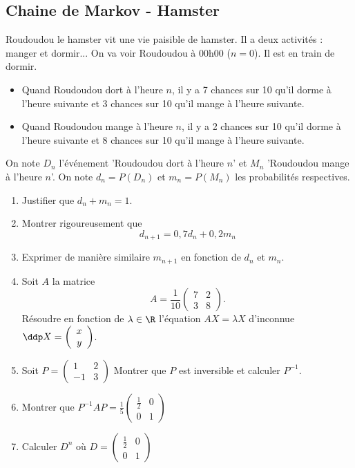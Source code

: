 \subsection{Chaine de Markov - Hamster}



\begin{exercice}
Roudoudou le hamster vit une vie paisible de hamster. Il a deux activités : manger et  dormir... 
On va voir Roudoudou à 00h00 ($n=0$). Il est en train de dormir. 
\begin{itemize}
\item Quand Roudoudou dort à l'heure $n$, il y a 7 chances sur 10 qu'il dorme à l'heure suivante et 3 chances sur 10 qu'il mange à l'heure suivante. 
\item Quand Roudoudou mange à l'heure $n$, il y a 2 chances sur 10 qu'il dorme à l'heure suivante et 8 chances sur 10 qu'il mange à l'heure suivante. 
\end{itemize}


On note $D_n$ l'événement 'Roudoudou dort à l'heure $n$' et $M_n$ 'Roudoudou mange à l'heure $n$'. On note $d_n =P(D_n)$ et $m_n=P(M_n)$ les probabilités respectives. 


\begin{enumerate}
\item Justifier que $d_n+m_n=1$. 
\item Montrer rigoureusement que $$d_{n+1} =  0,7d_n+0,2m_n$$
\item Exprimer de manière similaire $m_{n+1} $ en fonction de $d_n$ et $m_n$. 

\item Soit $A$ la matrice $$A=\frac{1}{10}\left(\begin{array}{ccc}
7 & 2\\
3 & 8
\end{array}
\right).$$
Résoudre en fonction de $\lambda \in \R$ l'équation $AX = \lambda X$ d'inconnue $\ddp X =\left(\begin{array}{c}
x \\
y 
\end{array}
\right)$. 
\item Soit $P = 
\left(\begin{array}{cc}
1 & 2\\	
-1 & 3
\end{array}
\right)$ Montrer que $P$ est inversible et calculer $P^{-1}$. 
\item Montrer que $P^{-1} A P =\frac{1}{5} \left(\begin{array}{cc}
 \frac{1}{2}& 0\\
0 &  1 
\end{array}
\right)$
\item Calculer $D^n$ où $D=\left(\begin{array}{cc}
 \frac{1}{2}& 0\\
0 &  1 
\end{array}
\right)$


\end{enumerate}
\end{exercice}
